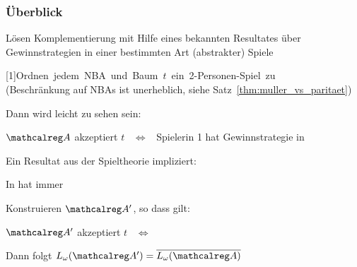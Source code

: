 \begin{frame}
  \frametitle{Überblick}

  \par\smallskip
  Lösen Komplementierung mit Hilfe eines bekannten Resultates
  über Gewinnstrategien in einer bestimmten Art (abstrakter) Spiele

  \par\medskip
  \begin{Itemize}
    \item
      \mbox{\scalebox{.98}[1]{Ordnen jedem NBA  und Baum $t$
      ein 2-Personen-Spiel  zu}\hspace*{-10mm}} \\
      {\small (Beschränkung auf NBAs ist unerheblich, siehe Satz~\ref{thm:muller_vs_paritaet})}
    \item
      Dann wird leicht zu sehen sein:
      \par\smallskip
      $\Aut{A}$ akzeptiert $t$ ~$\Leftrightarrow$~ Spielerin 1 hat Gewinnstrategie in 
    \item
      Ein Resultat aus der Spieltheorie impliziert:
      \par\smallskip
      In  hat immer \\
    \item
      Konstruieren $\Aut{A}'$, so dass gilt:
      \par\smallskip
      $\Aut{A}'$ akzeptiert $t$ ~$\Leftrightarrow$~ 
      \par\smallskip
      Dann folgt $L_\omega(\Aut{A}') = \overline{L_\omega(\Aut{A})}$
  \end{Itemize}
  

\end{frame}


